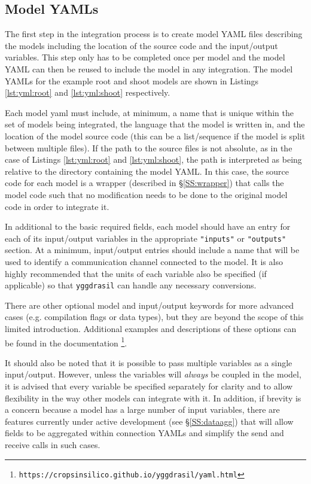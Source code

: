 \documentclass[journal]{IEEEtran}
\newcommand{\pkg}{{\tt yggdrasil}{}}
\newcommand{\pkglink}{yggdrasil}
\newcommand{\rootyml}{}
\newcommand{\shootyml}{}
\begin{document}
\subsection{Model YAMLs}\label{SS:model_yaml}
%
The first step in the integration process is to create model YAML files describing the models including the location of the source code and the input/output variables. This step only has to be completed once per model and the model YAML can then be reused to include the model in any integration. The model YAMLs for the example root and shoot models are shown in Listings \ref{lst:yml:root} and \ref{lst:yml:shoot} respectively.
%
\rootyml
%
\shootyml
%
Each model yaml must include, at minimum, a name that is unique within the set of models being integrated, the language that the model is written in, and the location of the model source code (this can be a list/sequence if the model is split between multiple files). If the path to the source files is not absolute, as in the case of Listings \ref{lst:yml:root} and \ref{lst:yml:shoot}, the path is interpreted as being relative to the directory containing the model YAML. In this case, the source code for each model is a wrapper (described in \S\ref{SS:wrapper}) that calls the model code such that no modification needs to be done to the original model code in order to integrate it.

In additional to the basic required fields, each model should have an entry for each of its input/output variables in the appropriate {\tt "inputs"} or {\tt "outputs"} section. At a minimum, input/output entries should include a name that will be used to identify a communication channel connected to the model. It is also highly recommended that the units of each variable also be specified (if applicable) so that {\pkg} can handle any necessary conversions.

There are other optional model and input/output keywords for more advanced cases (e.g. compilation flags or data types), but they are beyond the scope of this limited introduction. Additional examples and descriptions of these options can be found in the documentation \footnote{{\tt https://cropsinsilico.github.io/\pkglink/yaml.html}}.

It should also be noted that it is possible to pass multiple variables as a single input/output. However, unless the variables will \emph{always} be coupled in the model, it is advised that every variable be specified separately for clarity and to allow flexibility in the way other models can integrate with it. In addition, if brevity is a concern because a model has a large number of input variables, there are features currently under active development (see \S\ref{SS:dataagg}) that will allow fields to be aggregated within connection YAMLs and simplify the send and receive calls in such cases.
\end{document}

